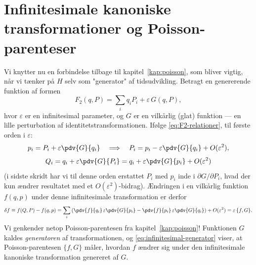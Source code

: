 \section{Infinitesimale kanoniske transformationer og Poisson-parenteser}

Vi knytter nu en forbindelse tilbage til kapitel~\ref{kap:poisson}, som
bliver vigtig, når vi tænker på $H$ selv som "generator" af
tidsudvikling. Betragt en genererende funktion af formen
\begin{equation}
  F_2(q,P) = \sum_i q_iP_i + \varepsilon\,G(q,P),
\end{equation}
hvor $\varepsilon$ er en infinitesimal parameter, og $G$ er en
vilkårlig (glat) funktion — en lille perturbation af
identitetstransformationen. Ifølge \eqref{eq:F2-relationer}, til
første orden i $\varepsilon$:
\begin{equation}
  p_i = P_i + \varepsilon\pdv{G}{q_i} \quad\Longrightarrow\quad P_i = p_i - \varepsilon\pdv{G}{q_i} + O(\varepsilon^2),
\end{equation}
\begin{equation}
  Q_i = q_i + \varepsilon\pdv{G}{P_i} = q_i + \varepsilon\pdv{G}{p_i} + O(\varepsilon^2)
\end{equation}
(i sidste skridt har vi til denne orden erstattet $P_i$ med $p_i$
inde i $\partial G/\partial P_i$, hvad der kun ændrer resultatet med et
$O(\varepsilon^2)$-bidrag). Ændringen i en vilkårlig funktion
$f(q,p)$ under denne infinitesimale transformation er derfor
\begin{equation}
  \delta f \equiv f(Q,P) - f(q,p)
  = \sum_i\left(\pdv{f}{q_i}\,\varepsilon\pdv{G}{p_i} - \pdv{f}{p_i}\,\varepsilon\pdv{G}{q_i}\right) + O(\varepsilon^2)
  = \varepsilon\,\{f,G\}.
  \label{eq:infinitesimal-generator}
\end{equation}
Vi genkender netop Poisson-parentesen fra kapitel~\ref{kap:poisson}!
Funktionen $G$ kaldes \emph{generatoren} af transformationen, og
\eqref{eq:infinitesimal-generator} viser, at Poisson-parentesen
$\{f,G\}$ måler, hvordan $f$ ændrer sig under den infinitesimale
kanoniske transformation genereret af $G$.

